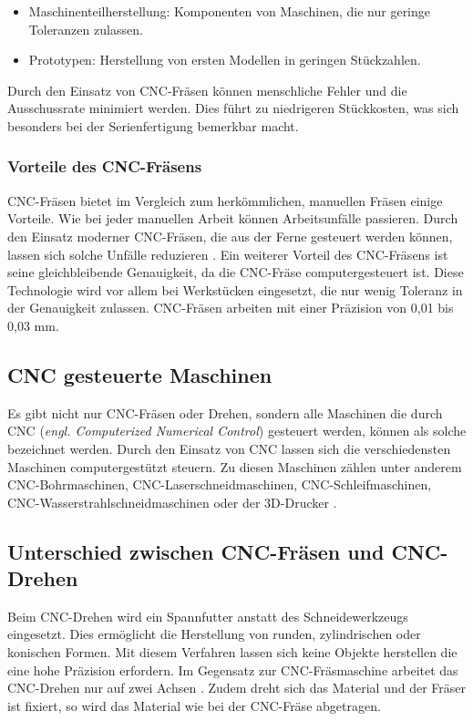 \begin{itemize}
	\item Maschinenteilherstellung: Komponenten von Maschinen, die nur geringe Toleranzen zulassen.
	\item Prototypen: Herstellung von ersten Modellen in geringen Stückzahlen.
\end{itemize}

Durch den Einsatz von CNC-Fräsen können menschliche Fehler und die Ausschussrate minimiert werden. Dies führt zu niedrigeren Stückkosten, was sich besonders bei der Serienfertigung bemerkbar macht.\\  \parencite{CNCFraesen3}


\subsubsection{Vorteile des CNC-Fräsens}
CNC-Fräsen bietet im Vergleich zum herkömmlichen, manuellen Fräsen einige Vorteile. Wie bei jeder manuellen Arbeit können Arbeitsunfälle passieren. Durch den Einsatz moderner CNC-Fräsen, die aus der Ferne gesteuert werden können, lassen sich solche Unfälle reduzieren \parencite{CNCFraesenVorteile}. Ein weiterer Vorteil des CNC-Fräsens ist seine gleichbleibende Genauigkeit, da die CNC-Fräse computergesteuert ist. Diese Technologie wird vor allem bei Werkstücken eingesetzt, die nur wenig Toleranz in der Genauigkeit zulassen. CNC-Fräsen arbeiten mit einer Präzision von 0,01 bis 0,03 mm. \\


\subsection{CNC gesteuerte Maschinen}
Es gibt nicht nur CNC-Fräsen oder Drehen, sondern alle Maschinen die durch CNC (\textit{engl. Computerized Numerical Control}) gesteuert werden, können als solche bezeichnet werden. Durch den Einsatz von CNC lassen sich die verschiedensten Maschinen computergestützt steuern. Zu diesen Maschinen zählen unter anderem CNC-Bohrmaschinen,  CNC-Laserschneidmaschinen, CNC-Schleifmaschinen, CNC-Wasserstrahlschneidmaschinen oder der 3D-Drucker \parencite{ArtenCNCMaschinen}
. \\


\subsection{Unterschied zwischen CNC-Fräsen und CNC-Drehen}
Beim CNC-Drehen wird ein Spannfutter anstatt des Schneidewerkzeugs eingesetzt. Dies ermöglicht die Herstellung von runden, zylindrischen oder konischen Formen. Mit diesem Verfahren lassen sich keine Objekte herstellen die eine hohe Präzision erfordern. Im Gegensatz zur CNC-Fräsmaschine arbeitet das CNC-Drehen nur auf zwei Achsen \parencite{CNCDrehenUnterschied}. Zudem dreht sich das Material und der Fräser ist fixiert, so wird das Material wie bei der CNC-Fräse abgetragen. \\


